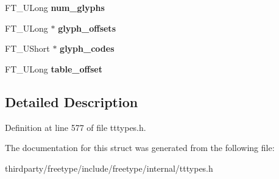 \begin{DoxyCompactItemize}
F\+T\+\_\+\+U\+Long {\bfseries num\+\_\+glyphs}
\item 
\mbox{\label{struct_t_t___s_bit___range_rec___a475f649f101b5886cc2443934e6aa9ca}} 
F\+T\+\_\+\+U\+Long $\ast$ {\bfseries glyph\+\_\+offsets}
\item 
\mbox{\label{struct_t_t___s_bit___range_rec___ad40d4aa7e48bdb4ab8c98850f1bba178}} 
F\+T\+\_\+\+U\+Short $\ast$ {\bfseries glyph\+\_\+codes}
\item 
\mbox{\label{struct_t_t___s_bit___range_rec___a54457937305b5ccf895f5b23c0cc6006}} 
F\+T\+\_\+\+U\+Long {\bfseries table\+\_\+offset}
\end{DoxyCompactItemize}


\subsection{Detailed Description}


Definition at line 577 of file tttypes.\+h.



The documentation for this struct was generated from the following file\+:\begin{DoxyCompactItemize}
\item 
thirdparty/freetype/include/freetype/internal/tttypes.\+h\end{DoxyCompactItemize}
